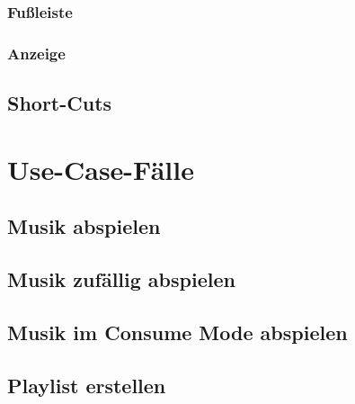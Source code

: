 \subsubsection{Fußleiste}
\subsubsection{Anzeige}
\subsection{Short-Cuts}
\section{Use-Case-Fälle}
\subsection{Musik abspielen}
\subsection{Musik zufällig abspielen}
\subsection{Musik im Consume Mode abspielen}
\subsection{Playlist erstellen}


